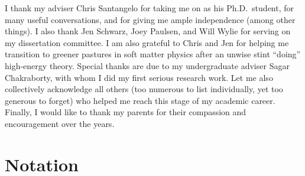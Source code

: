 I thank my adviser Chris Santangelo for taking me on as his Ph.D.~student, for many useful conversations, and for giving me ample independence (among other things).
I also thank Jen Schwarz, Joey Paulsen, and Will Wylie for serving on my dissertation committee.
I am also grateful to Chris and Jen for helping me transition to greener pastures in soft matter physics after an unwise stint ``doing'' high-energy theory.
Special thanks are due to my undergraduate adviser Sagar Chakraborty, with whom I did my first serious research work.
Let me also collectively acknowledge all others (too numerous to list individually, yet too generous to forget) who helped me reach this stage of my academic career.
Finally, I would like to thank my parents for their compassion and encouragement over the years.

\ifdeadtree
  \blankpage
\fi


\ifsustyle
  \newpage\pagestyle{plain}
\else
  \newpage\pagestyle{headings}
\fi

\ifsustyle
  \relax
\else
  \setlength{\cftbeforechapterskip}{0.5em}
\fi

\setcounter{tocdepth}{2}

\tableofcontents*


\chapter*{Notation}




\mainmatter

\pagestyle{headings}








\setcounter{footnote}{0}
\def\thefootnote{\fnsymbol{footnote}}

